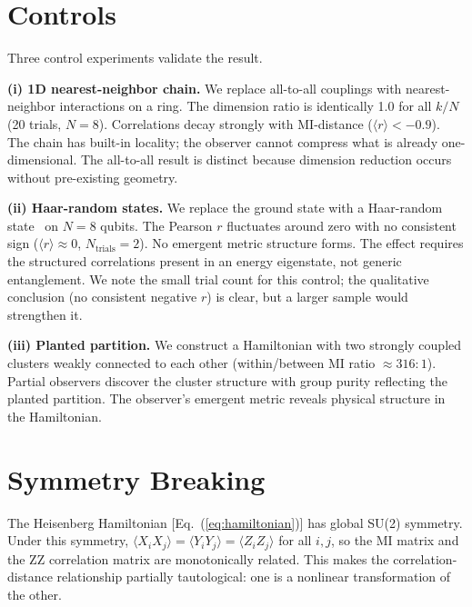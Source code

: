 \documentclass[aps,pra,twocolumn,superscriptaddress]{revtex4-2}
\begin{document}
\section{Controls}
\label{sec:controls}

Three control experiments validate the result.

\textbf{(i) 1D nearest-neighbor chain.}
We replace all-to-all couplings with nearest-neighbor interactions on a ring. The dimension ratio is identically 1.0 for all $k/N$ (20 trials, $N = 8$). Correlations decay strongly with MI-distance ($\langle r \rangle < -0.9$). The chain has built-in locality; the observer cannot compress what is already one-dimensional. The all-to-all result is distinct because dimension reduction occurs without pre-existing geometry.

\textbf{(ii) Haar-random states.}
We replace the ground state with a Haar-random state~\cite{hayden2004} on $N = 8$ qubits. The Pearson $r$ fluctuates around zero with no consistent sign ($\langle r \rangle \approx 0$, $N_\text{trials} = 2$). No emergent metric structure forms. The effect requires the structured correlations present in an energy eigenstate, not generic entanglement. We note the small trial count for this control; the qualitative conclusion (no consistent negative $r$) is clear, but a larger sample would strengthen it.

\textbf{(iii) Planted partition.}
We construct a Hamiltonian with two strongly coupled clusters weakly connected to each other (within/between MI ratio $\approx 316{:}1$). Partial observers discover the cluster structure with group purity reflecting the planted partition. The observer's emergent metric reveals physical structure in the Hamiltonian.


\section{Symmetry Breaking}
\label{sec:symmetry}

The Heisenberg Hamiltonian [Eq.~(\ref{eq:hamiltonian})] has global SU(2) symmetry. Under this symmetry, $\langle X_i X_j \rangle = \langle Y_i Y_j \rangle = \langle Z_i Z_j \rangle$ for all $i, j$, so the MI matrix and the ZZ correlation matrix are monotonically related. This makes the correlation-distance relationship partially tautological: one is a nonlinear transformation of the other.
\end{document}
